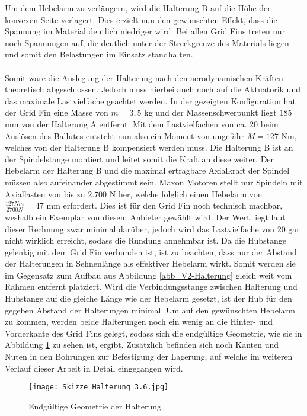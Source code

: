 Um dem Hebelarm zu verlängern, wird die Halterung B auf die Höhe der konvexen Seite verlagert. Dies erzielt nun den gewünschten Effekt, dass die Spannung im Material deutlich niedriger wird. Bei allen Grid Fins treten nur noch Spannungen auf, die deutlich unter der Streckgrenze des Materials liegen und somit den Belastungen im Einsatz standhalten.
\\~\\
Somit wäre die Auslegung der Halterung nach den aerodynamischen Kräften theoretisch abgeschlossen. Jedoch muss hierbei auch noch auf die Aktuatorik und das maximale Lastvielfache geachtet werden. In der gezeigten Konfiguration hat der Grid Fin eine Masse von $m = 3,5$ kg und der Massenschwerpunkt liegt $185$ mm von der Halterung A entfernt. Mit dem Lastvielfachen von ca. 20 beim Auslösen des Ballutes entsteht nun also ein Moment von ungefähr $M=127$ Nm, welches von der Halterung B kompensiert werden muss. Die Halterung B ist an der Spindelstange montiert und leitet somit die Kraft an diese weiter. Der Hebelarm der Halterung B und die maximal ertragbare Axialkraft der Spindel müssen also aufeinander abgestimmt sein. Maxon Motoren stellt nur Spindeln mit Axiallasten von bis zu $2.700$ N her, welche folglich einen Hebelarm von $\frac{127Nm}{2700N}=47$ mm erfordert. Dies ist für den Grid Fin noch technisch machbar, weshalb ein Exemplar von diesem Anbieter gewählt wird. Der Wert liegt laut dieser Rechnung zwar minimal darüber, jedoch wird das Lastvielfache von 20 gar nicht wirklich erreicht, sodass die Rundung annehmbar ist. Da die Hubstange gelenkig mit dem Grid Fin verbunden ist, ist zu beachten, dass nur der Abstand der Halterungen in Sehnenlänge als effektiver Hebelarm wirkt. Somit werden sie im Gegensatz zum Aufbau aus Abbildung \ref{abb_V2-Halterung} gleich weit vom Rahmen entfernt platziert. Wird die Verbindungsstange zwischen Halterung und Hubstange auf die gleiche Länge wie der Hebelarm gesetzt, ist der Hub für den gegeben Abstand der Halterungen minimal. Um auf den gewünschten Hebelarm zu kommen, werden beide Halterungen noch ein wenig an die Hinter- und Vorderkante des Grid Fins gelegt, sodass sich die endgültige Geometrie, wie sie in Abbildung \ref{abb_Halterung-fertig} zu sehen ist, ergibt. Zusätzlich befinden sich noch Kanten und Nuten in den Bohrungen zur Befestigung der Lagerung, auf welche im weiteren Verlauf dieser Arbeit in Detail eingegangen wird.
\begin{figure}[h] 
	\centering
	\texttt{[image: Skizze Halterung 3.6.jpg]}
	\caption{Endgültige Geometrie der Halterung}
	\label{abb_Halterung-fertig}
\end{figure}\\
